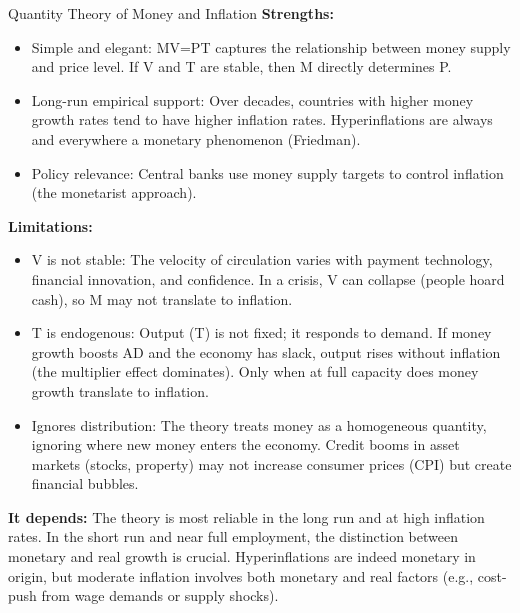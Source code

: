 \documentclass[11pt, a4paper, twoside]{book}
\begin{document}
\begin{evaluation}{Quantity Theory of Money and Inflation}
\textbf{Strengths:}
\begin{itemize}
  \item Simple and elegant: MV=PT captures the relationship between money supply and price level. If V and T are stable, then M directly determines P.
  \item Long-run empirical support: Over decades, countries with higher money growth rates tend to have higher inflation rates. Hyperinflations are always and everywhere a monetary phenomenon (Friedman).
  \item Policy relevance: Central banks use money supply targets to control inflation (the monetarist approach).
\end{itemize}

\textbf{Limitations:}
\begin{itemize}
  \item V is not stable: The velocity of circulation varies with payment technology, financial innovation, and confidence. In a crisis, V can collapse (people hoard cash), so M may not translate to inflation.
  \item T is endogenous: Output (T) is not fixed; it responds to demand. If money growth boosts AD and the economy has slack, output rises without inflation (the multiplier effect dominates). Only when at full capacity does money growth translate to inflation.
  \item Ignores distribution: The theory treats money as a homogeneous quantity, ignoring where new money enters the economy. Credit booms in asset markets (stocks, property) may not increase consumer prices (CPI) but create financial bubbles.
\end{itemize}

\textbf{It depends:}
The theory is most reliable in the long run and at high inflation rates. In the short run and near full employment, the distinction between monetary and real growth is crucial. Hyperinflations are indeed monetary in origin, but moderate inflation involves both monetary and real factors (e.g., cost-push from wage demands or supply shocks).
\end{evaluation}
\end{document}
